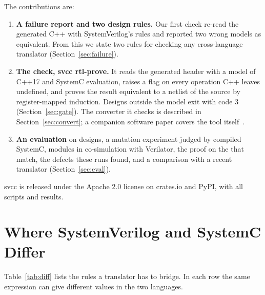 \documentclass{ieeeaccess}
\newcommand{\code}[1]{{\fontshape{n}\ttfamily #1}}
\begin{document}
The contributions are:
\begin{enumerate}
\item \textbf{A failure report and two design rules.} Our first check re-read the generated C++
with SystemVerilog's rules and reported two wrong models as equivalent. From this we state two
rules for checking any cross-language translator (Section~\ref{sec:failure}).
\item \textbf{The check, \code{svcc rtl-prove}.} It reads the generated header with a model of
C++17 and SystemC evaluation, raises a flag on every operation C++ leaves undefined, and proves the
result equivalent to a netlist of the source by register-mapped induction. Designs outside the
model exit with code 3 (Section~\ref{sec:gate}). The converter it checks is described in
Section~\ref{sec:convert}; a companion software paper covers the tool itself~\cite{kubavat2026svccsx}.
\item \textbf{An evaluation} on \nDesigns{} designs, a mutation experiment judged by compiled
SystemC, \nModules{} modules in co-simulation with Verilator, the proof on the \nMatch{} that
match, the defects these runs found, and a
comparison with a recent translator (Section~\ref{sec:eval}).
\end{enumerate}
\code{svcc} is released under the Apache 2.0 license on crates.io and PyPI, with all scripts and
results.

\section{Where SystemVerilog and SystemC Differ}
\label{sec:diff}

Table~\ref{tab:diff} lists the rules a translator has to bridge. In each row the same expression
can give different values in the two languages.
\end{document}
